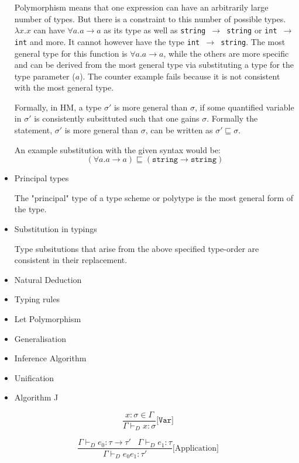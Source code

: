 \documentclass{l4proj}
\begin{document}
\begin{itemize}
    Polymorphism means that one expression can have an arbitrarily large number of types.
    But there is a constraint to this number of possible types.
    $\lambda x . x$ can have $\forall a . a \rightarrow a$ as its type as well as \texttt{string $\rightarrow$ string} or \texttt{int $\rightarrow$ int} and more.
    It cannot however have the type \texttt{int $\rightarrow$ string}.
    The most general type for this function is $\forall a . a \rightarrow a$, while the others are more specific and can be derived from the most general type via substituting a type for the type parameter ($a$).
    The counter example fails because it is not consistent with the most general type.

    Formally, in HM, a type $\sigma ' $ is more general than $\sigma$, if some quantified variable in $\sigma'$ is consistently subsittuted such that one gains $\sigma$.
    Formally the statement, $\sigma ' $ is more general than $\sigma$, can be written as $\sigma' \sqsubseteq \sigma$.

    An example substitution with the given syntax would be:
    \[(\forall a . a \rightarrow a) \sqsubseteq (\texttt{string} \rightarrow \texttt{string})\]
    \item Principal types
    
    The "principal" type of a type scheme or polytype is the most general form of the type.
    \item Substitution in typings
    
    Type subsitutions that arise from the above specified type-order are consistent in their replacement.
    \item Natural Deduction
    \item Typing rules
    \item Let Polymorphism
    \item Generalisation
    \item Inference Algorithm
    \item Unification 
    \item Algorithm J
    
\end{itemize}


\begin{equation} \label{eq:HM-Var}
    \frac{x : \sigma \in \Gamma}{\Gamma \vdash_D x : \sigma}\texttt{[Var]}
\end{equation}

\begin{equation} \label{eq:HM-App}
    \frac{\Gamma \vdash_D e_0 : \tau \rightarrow \tau' \;\;\; \Gamma \vdash_D e_1 : \tau}{\Gamma \vdash_D e_0 e_1 : \tau'}\text{[Application]}
\end{equation}
\end{document}
